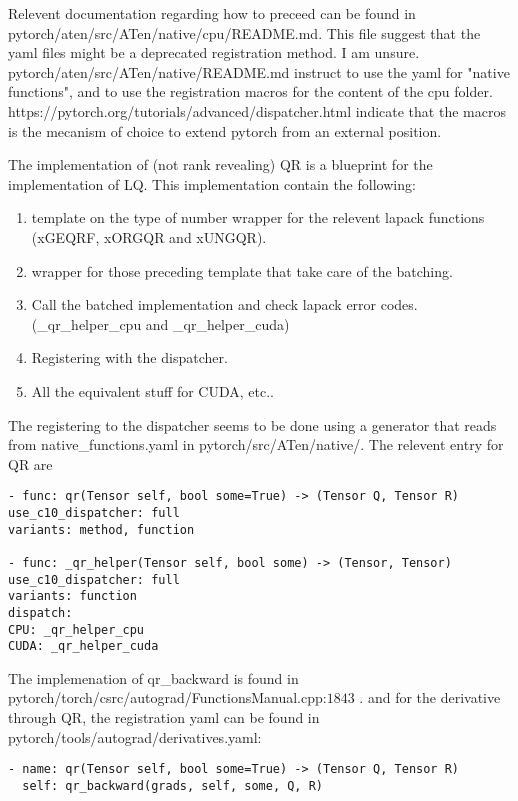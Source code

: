 \documentclass[15pt]{article}
\begin{document}
Relevent documentation regarding how to preceed can be found in\\
pytorch/aten/src/ATen/native/cpu/README.md.
This file suggest that the yaml files might be a deprecated registration method. I am unsure.\\
pytorch/aten/src/ATen/native/README.md instruct to use the yaml for "native functions", and to use the registration macros for the content of the cpu folder.\\
https://pytorch.org/tutorials/advanced/dispatcher.html indicate that the macros is the mecanism of choice to extend pytorch from an external position.

The implementation of (not rank revealing) QR is a blueprint for the implementation of LQ.
This implementation contain the following:

\begin{enumerate}
    \item template on the type of number wrapper for the relevent lapack functions (xGEQRF, xORGQR and xUNGQR).
    \item wrapper for those preceding template that take care of the batching.
    \item Call the batched implementation and check lapack error codes. (\_qr\_helper\_cpu and \_qr\_helper\_cuda)
    \item Registering with the dispatcher.
    \item All the equivalent stuff for CUDA, etc..
\end{enumerate}
The registering to the dispatcher seems to be done using a generator that reads from native\_functions.yaml in pytorch/src/ATen/native/.
The relevent entry for QR are
\begin{verbatim}
- func: qr(Tensor self, bool some=True) -> (Tensor Q, Tensor R)
use_c10_dispatcher: full
variants: method, function

- func: _qr_helper(Tensor self, bool some) -> (Tensor, Tensor)
use_c10_dispatcher: full
variants: function
dispatch:
CPU: _qr_helper_cpu
CUDA: _qr_helper_cuda
\end{verbatim}

The implemenation of qr\_backward is found in\\ pytorch/torch/csrc/autograd/FunctionsManual.cpp:$1843$ .
and for the derivative through QR, the registration yaml can be found in \\
pytorch/tools/autograd/derivatives.yaml:
\begin{verbatim}
- name: qr(Tensor self, bool some=True) -> (Tensor Q, Tensor R)
  self: qr_backward(grads, self, some, Q, R)
\end{verbatim}
\end{document}
